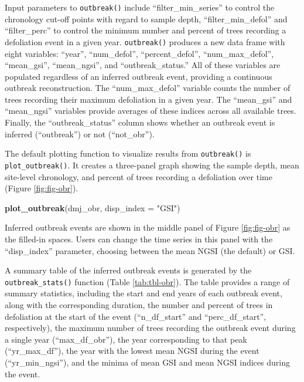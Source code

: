 \documentclass[review]{elsarticle} %
\newenvironment{Shaded}{\begin{snugshade}}{\end{snugshade}}
\newcommand{\DataTypeTok}[1]{\textcolor[rgb]{0.13,0.29,0.53}{#1}}
\newcommand{\KeywordTok}[1]{\textcolor[rgb]{0.13,0.29,0.53}{\textbf{#1}}}
\newcommand{\NormalTok}[1]{#1}
\newcommand{\StringTok}[1]{\textcolor[rgb]{0.31,0.60,0.02}{#1}}
\begin{document}
Input parameters to \texttt{outbreak()} include ``filter\_min\_series'' to control the chronology cut-off points with regard to sample depth, ``filter\_min\_defol'' and ``filter\_perc'' to control the minimum number and percent of trees recording a defoliation event in a given year. \texttt{outbreak()} produces a new data frame with eight variables: ``year'', ``num\_defol'', ``percent\_defol'', ``num\_max\_defol'', ``mean\_gsi'', ``mean\_ngsi'', and ``outbreak\_status.'' All of these variables are populated regardless of an inferred outbreak event, providing a continuous outbreak reconstruction. The ``num\_max\_defol'' variable counts the number of trees recording their maximum defoliation in a given year. The ``mean\_gsi'' and ``mean\_ngsi'' variables provide averages of these indices across all available trees. Finally, the ``outbreak\_status'' column shows whether an outbreak event is inferred (``outbreak'') or not (``not\_obr'').

The default plotting function to visualize results from \texttt{outbreak()} is \texttt{plot\_outbreak()}. It creates a three-panel graph showing the sample depth, mean site-level chronology, and percent of trees recording a defoliation over time (Figure \ref{fig:fig-obr}).

\begin{Shaded}
\begin{Highlighting}[]
\KeywordTok{plot_outbreak}\NormalTok{(dmj_obr, }\DataTypeTok{disp_index =} \StringTok{"GSI"}\NormalTok{)}
\end{Highlighting}
\end{Shaded}

Inferred outbreak events are shown in the middle panel of Figure \ref{fig:fig-obr} as the filled-in spaces. Users can change the time series in this panel with the ``disp\_index'' parameter, choosing between the mean NGSI (the default) or GSI.

A summary table of the inferred outbreak events is generated by the \texttt{outbreak\_stats()} function (Table \ref{tab:tbl-obr}). The table provides a range of summary statistics, including the start and end years of each outbreak event, along with the corresponding duration, the number and percent of trees in defoliation at the start of the event (``n\_df\_start'' and ``perc\_df\_start'', respectively), the maximum number of trees recording the outbreak event during a single year (``max\_df\_obr''), the year corresponding to that peak (``yr\_max\_df''), the year with the lowest mean NGSI during the event (``yr\_min\_ngsi''), and the minima of mean GSI and mean NGSI indices during the event.
\end{document}

